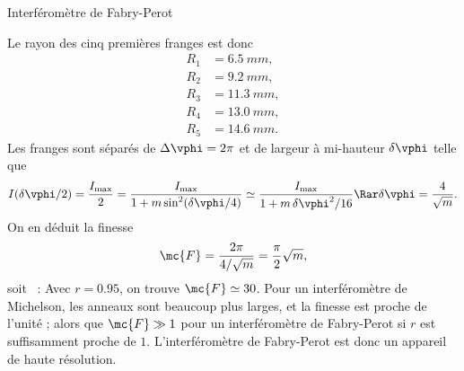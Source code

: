 \begin{exo}[PC][1][devoir]{Interféromètre de Fabry-Perot}
\begin{quest}
{    
    Le rayon des cinq premières franges est donc
    \begin{align*}
      R_1 & = \SI{6.5}{mm}, \\
      R_2 & = \SI{9.2}{mm}, \\
      R_3 & = \SI{11.3}{mm}, \\
      R_4 & = \SI{13.0}{mm}, \\
      R_5 & = \SI{14.6}{mm}.
    \end{align*}
  }
  {
  Les franges sont séparés de $\Delta \vphi = 2\pi$ et de largeur à mi-hauteur $\delta \vphi $ telle que 
  $$
  I(\delta \vphi/2) = \frac{I_{\rm max}}{2} = \frac{I_{\rm max}}{1+m\sin^2(\delta \vphi/4)} \simeq \frac{I_{\rm max}}{1+m\,\delta \vphi^2/16} \Rar \delta \vphi = \frac{4}{\sqrt{m}}.
  $$
  On en déduit la finesse
  $$
  \mc{F} = \frac{2\pi }{4/\sqrt{m}} = \frac{\pi}{2} \sqrt{m},
  $$
  soit
  \AN~:  Avec $r=\num{0,95}$, on trouve $\mc{F} \simeq 30$. 
  Pour un interféromètre de Michelson, les anneaux sont beaucoup plus larges, et la finesse est proche de l'unité ; alors que $\mc{F} \gg 1$ pour un interféromètre de Fabry-Perot si $r$ est suffisamment proche de $1$. L'interféromètre de Fabry-Perot est donc un appareil de haute résolution.
  }
  \end{quest}
  \end{exo}
  
